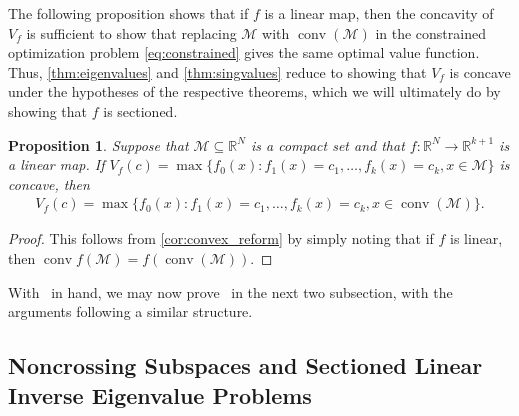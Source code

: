 \documentclass{article}
\numberwithin{equation}{section}
\newcommand{\R}{\mathbb{R}}
\DeclareMathOperator*{\conv}{conv}
\newtheorem{proposition}[thm]{Proposition}
\newcommand{\cM}{{\mathcal{M}}}
\begin{document}
The following proposition shows that if $f$ is a linear map, then the concavity of $V_f$ is sufficient to show that replacing $\cM$ with $\conv(\cM)$ in the constrained optimization problem \eqref{eq:constrained} gives the same optimal value function. Thus, \cref{thm:eigenvalues} and \cref{thm:singvalues} reduce to showing that $V_f$ is concave under the hypotheses of the respective theorems, which we will ultimately do by showing that $f$ is sectioned.
\newcommand{\barf}{f}
\begin{proposition}
    \label{prop:linear_proj}
    Suppose that $\cM \subseteq \R^N$ is a compact set and that $\barf : \R^N \rightarrow \R^{k+1}$ is a  linear map. If $V_f(c) = \max \{f_0(x) : f_1(x) = c_1, \dots, f_k(x) = c_k, x \in \cM\}$ is concave, then
    \begin{align*}
        V_f(c) = \max \{\barf_0(x) : \barf_1(x) = c_1, \dots, \barf_k(x) = c_k, x \in \conv(\cM)\}.
    \end{align*}
\end{proposition}
\begin{proof}
This follows from \cref{cor:convex_reform} by simply noting that if $f$ is linear, then $\conv f(\cM) = f(\conv(\cM))$.
\end{proof}

With~ in hand, we may now prove~ in the next two subsection, with the arguments following a similar structure.

\subsection{Noncrossing Subspaces and Sectioned Linear Inverse Eigenvalue Problems}\label{subsec:liep}
\end{document}
